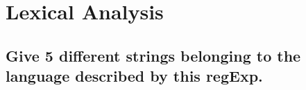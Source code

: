 \section{Lexical Analysis}      
\subsection{Give 5 different strings belonging to the language described by this regExp.}
